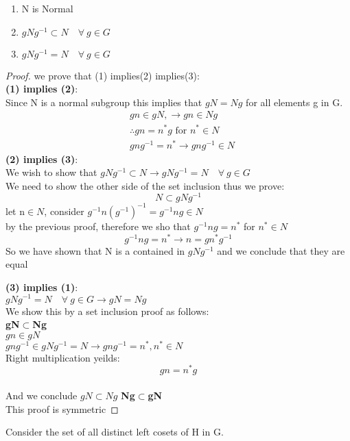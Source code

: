 \documentclass[11pt]{article}
\theoremstyle{definition}  %
\newcommand{\block}[2]{\begin{tcolorbox}[title={#1}]{#2}\end{tcolorbox}}
\begin{document}
\block{Let N be a sugroup of a group G then the following are equivilant }{\begin{enumerate}
  \item N is Normal
  \item$ gNg^{-1}\subset N \quad \forall \ g\in G$
  \item  $gNg^{-1}=N \quad \forall\ g \in G $
\end{enumerate}
\begin{proof}
  we prove that (1) implies(2) implies(3):\\
  \textbf{(1) implies (2)}:\\
  Since N is a normal subgroup this implies that $gN=Ng$ for all elements g in G. \\
  \begin{align*}
    &gn\in gN, \rightarrow gn\in Ng\\
    &\therefore gn=n^*g \text{ for }n^*\in N\\
    &gng^{-1}=n^*\rightarrow gng^{-1}\in N
  \end{align*}
  \textbf{(2) implies (3)}:\\
  We wish to show that $  gNg^{-1}\subset N\rightarrow gNg^{-1}=N\quad \forall\ g\in G $\\
  We need to show the other side of the set inclusion thus we prove:
  \[
    N\subset gNg^{-1}
  \]
  let n$\in N$, consider $g^{-1}n(g^{-1})^{-1}=g^{-1}ng\in N $\\ by the previous proof, therefore we sho that $g^{-1}ng=n^*$ for $n^*\in N$ \\
  \[
    g^{-1}ng=n^*\rightarrow n=gn^*g^{-1}
  \]
  So we have shown that N is a contained in $gNg^{-1}$ and we conclude that they are equal

  \textbf{(3) implies (1)}:\\
      $gNg^{-1}=N\quad \forall\ g\in G \rightarrow gN=Ng$\\
      We show this by a set inclusion proof as follows:
      \\\textbf{gN$\subset$Ng}\\
      $gn\in gN$\\
      $gng^{-1}\in gNg^{-1}=N\rightarrow gng^{-1}=n^*, n^*\in N$\\ Right multiplication yeilds:
      \[
        gn=n^*g
      \]\\
      And we conclude $gN\subset Ng$
      \textbf{Ng$\subset$gN}\\
      This proof is symmetric
\end{proof}}
\block{Theorem: G is always a normal subgroup of itself. }{}
\block{Start with a group and a subgroup H of G }{Consider the set of all distinct left cosets of H in G.}
\end{document}
